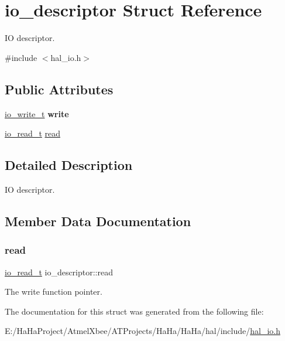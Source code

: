 \hypertarget{structio__descriptor}{}\section{io\+\_\+descriptor Struct Reference}
\label{structio__descriptor}


IO descriptor.  




{\ttfamily \#include $<$hal\+\_\+io.\+h$>$}

\subsection*{Public Attributes}
\begin{DoxyCompactItemize}
\item 
\mbox{\label{structio__descriptor_a962235264b6c73e3ab712acb64022194}} 
\hyperlink{group__doc__driver__hal__helper__io_gacb03c48993a6786f00946c196c40add1}{io\+\_\+write\+\_\+t} {\bfseries write}
\item 
\hyperlink{group__doc__driver__hal__helper__io_ga4d9ae58de2887289fe09eac6f0aa8be7}{io\+\_\+read\+\_\+t} \hyperlink{structio__descriptor_a8ad97905c11dc07cd30373afc0fc146f}{read}
\end{DoxyCompactItemize}


\subsection{Detailed Description}
IO descriptor. 

\subsection{Member Data Documentation}
\mbox{\label{structio__descriptor_a8ad97905c11dc07cd30373afc0fc146f}} 
\subsubsection{\texorpdfstring{read}{read}}
{\footnotesize\ttfamily \hyperlink{group__doc__driver__hal__helper__io_ga4d9ae58de2887289fe09eac6f0aa8be7}{io\+\_\+read\+\_\+t} io\+\_\+descriptor\+::read}

The write function pointer. 

The documentation for this struct was generated from the following file\+:\begin{DoxyCompactItemize}
\item 
E\+:/\+Ha\+Ha\+Project/\+Atmel\+Xbee/\+A\+T\+Projects/\+Ha\+Ha/\+Ha\+Ha/hal/include/\hyperlink{hal__io_8h}{hal\+\_\+io.\+h}\end{DoxyCompactItemize}

